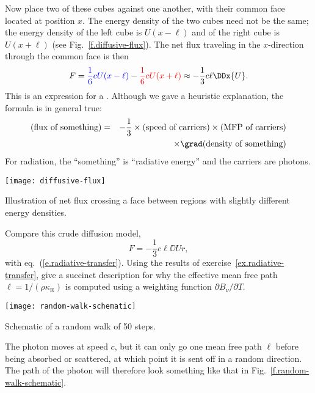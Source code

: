 Now place two of these cubes against one another, with their common face located at position $x$. The energy density of the two cubes need not be the same; the energy density of the left cube is $U(x-\ell)$ and of the right cube is $U(x+\ell)$ (see Fig.~\ref{f.diffusive-flux}). The net flux traveling in the $x$-direction through the common face is then
\[
	F = {\color{blue}\frac{1}{6} c U(x-\ell)} - {\color{red}\frac{1}{6} c U(x+\ell)} \approx -\frac{1}{3}c\ell \DDx{U}.
\]
This is an expression for a . Although we gave a heuristic explanation, the formula is in general true:
\begin{eqnarray}
\nonumber
(\textrm{flux of something}) &=& -\frac{1}{3}\times(\textrm{speed of carriers})\times(\textrm{MFP of carriers})\\
&&\times \grad(\textrm{density of something})
\label{e.diffusive-flux}
\end{eqnarray}
For radiation, the ``something'' is ``radiative energy'' and the carriers are photons.
\begin{marginfigure}[-12\baselineskip]
\texttt{[image: diffusive-flux]}
\caption[Transport along a gradient]{\label{f.diffusive-flux} Illustration of net flux crossing a face between regions with slightly different energy densities.}
\end{marginfigure}

\begin{exercisebox}
Compare this crude diffusion model,
\[
	F = -\frac{1}{3}c\ell\DD{U}{r},
\]
with eq.~(\ref{e.radiative-transfer}). Using the results of exercise~\ref{ex.radiative-transfer}, give a succinct description for why the effective mean free path $\ell = 1/(\rho\kappa_{\mathrm{R}})$ is computed using a weighting function $\partial B_{\nu}/\partial T$.
\end{exercisebox}

\begin{marginfigure}
\texttt{[image: random-walk-schematic]}
\caption[Schematic of a random walk]{\label{f.random-walk-schematic}Schematic of a random walk of 50 steps.}
\end{marginfigure}
The photon moves at speed $c$, but it can only go one mean free path $\ell$ before being absorbed or scattered, at which point it is sent off in a random direction. The path of the photon will therefore look something like that in Fig.~\ref{f.random-walk-schematic}.

